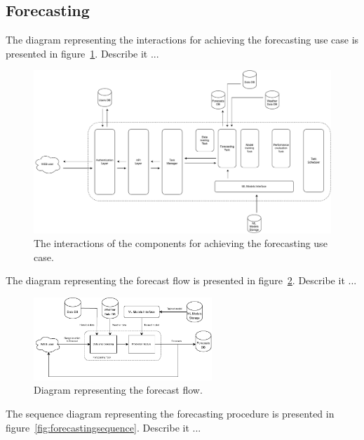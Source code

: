 \vspace{0.1 cm}
\subsection{Forecasting}
\label{sec:forecasting}
\vspace{0.1 cm}

The diagram representing the interactions for achieving the forecasting use case is presented in figure~\ref{fig:forecastinginteractions}.
Describe it ...

\begin{figure}[H]
\centering
\includegraphics[width=1\textwidth]{images/architecture_forecasting_interactions}
\caption{The interactions of the components for achieving the forecasting use case.}
\label{fig:forecastinginteractions}
\end{figure}

The diagram representing the forecast flow is presented in figure~\ref{fig:forecastflow}.
Describe it ...

\begin{figure}[H]
\centering
\includegraphics[width=0.6\textwidth]{images/architecture_forecasting_flow}
\caption{Diagram representing the forecast flow.}
\label{fig:forecastflow}
\end{figure}

The sequence diagram representing the forecasting procedure is presented in figure~\ref{fig:forecastingsequence}.
Describe it ...

